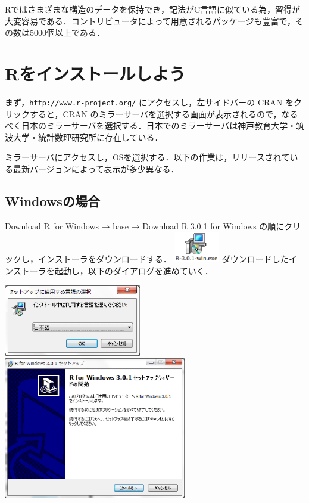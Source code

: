 \documentclass[a4paper,10pt,fleqn]{jarticle}
\begin{document}
Rではさまざまな構造のデータを保持でき，記法がC言語に似ている為，習得が大変容易である．コントリビュータによって用意されるパッケージも豊富で，その数は5000個以上である．

\section{Rをインストールしよう}
まず，{\tt http://www.r-project.org/} にアクセスし，左サイドバーの CRAN をクリックすると，CRAN のミラーサーバを選択する画面が表示されるので，なるべく日本のミラーサーバを選択する．日本でのミラーサーバは神戸教育大学・筑波大学・統計数理研究所に存在している．

ミラーサーバにアクセスし，OSを選択する．以下の作業は，リリースされている最新バージョンによって表示が多少異なる．
\subsection{Windowsの場合}
Download R for Windows → base → Download R 3.0.1 for Windows の順にクリックし，インストーラをダウンロードする．
\includegraphics[width=2cm]{img/windows/win001.eps} ダウンロードしたインストーラを起動し，以下のダイアログを進めていく．

\includegraphics[width=6cm]{img/windows/win002.eps}\hspace{0.8em} \includegraphics[width=8cm]{img/windows/win003.eps}\\
\end{document}
